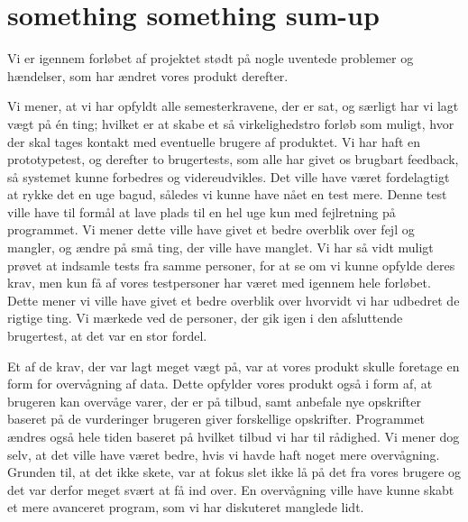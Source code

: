 \chapter{something something sum-up} 
Vi er igennem forløbet af projektet stødt på nogle uventede problemer og hændelser, som har ændret vores produkt derefter.

Vi mener, at vi har opfyldt alle semesterkravene, der er sat, og særligt har vi lagt vægt på én ting;
hvilket er at skabe et så virkelighedstro forløb som muligt, hvor der skal tages kontakt med eventuelle brugere af produktet.
Vi har haft en prototypetest, og derefter to brugertests, som alle har givet os brugbart feedback, så systemet kunne forbedres og videreudvikles.
Det ville have været fordelagtigt at rykke det en uge bagud, således vi kunne have nået en test mere.
Denne test ville have til formål at lave plads til en hel uge kun med fejlretning på programmet.
Vi mener dette ville have givet et bedre overblik over fejl og mangler, og ændre på små ting, der ville have manglet.
Vi har så vidt muligt prøvet at indsamle tests fra samme personer, for at se om vi kunne opfylde deres krav, men kun få af vores testpersoner har været med igennem hele forløbet.
Dette mener vi ville have givet et bedre overblik over hvorvidt vi har udbedret de rigtige ting. 
Vi mærkede ved de personer, der gik igen i den afsluttende brugertest, at det var en stor fordel. 

Et af de krav, der var lagt meget vægt på, var at vores produkt skulle foretage en form for overvågning af data. 
Dette opfylder vores produkt også i form af, at brugeren kan overvåge varer, der er på tilbud, samt anbefale nye opskrifter baseret på de vurderinger brugeren giver forskellige opskrifter.
Programmet ændres også hele tiden baseret på hvilket tilbud vi har til rådighed.
Vi mener dog selv, at det ville have været bedre, hvis vi havde haft noget mere overvågning.
Grunden til, at det ikke skete, var at fokus slet ikke lå på det fra vores brugere og det var derfor meget svært at få ind over.
En overvågning ville have kunne skabt et mere avanceret program, som vi har diskuteret manglede lidt.

